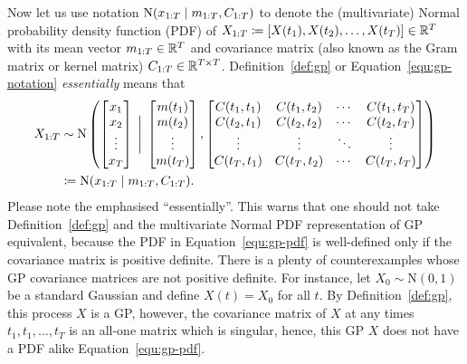 \documentclass[]{article}
\begin{document}
Now let us use notation $\mathrm{N}(x_{1:T} {\;|\;} m_{1:T}, C_{1:T})$ to denote the (multivariate) Normal probability density function (PDF) of $X_{1:T} \coloneqq [ X(t_1), X(t_2), \ldots, X(t_T) ] \allowbreak\in\mathbb{R}^T$ with its mean vector $m_{1:T} \in \mathbb{R}^T$ and covariance matrix (also known as the Gram matrix or kernel matrix) $C_{1:T} \in \mathbb{R}^{T\times T}$. Definition~\ref{def:gp} or Equation~\eqref{equ:gp-notation} \emph{essentially} means that  
%
\begin{equation}
	\begin{split}
		X_{1:T} &\sim 
		\mathrm{N}\left( 
		\begin{bmatrix}
			x_1 \\
			x_2 \\
			\vdots \\
			x_T
		\end{bmatrix} {\;\Bigg|\;}
		\begin{bmatrix}
			m(t_1) \\
			m(t_2) \\
			\vdots \\
			m(t_T)
		\end{bmatrix}, 
		\begin{bmatrix}
			C(t_1, t_1) & C(t_1, t_2) & \cdots & C(t_1, t_T) \\
			C(t_2, t_1) & C(t_2, t_2) & \cdots & C(t_2, t_T) \\
			\vdots      & \vdots      &\ddots  & \vdots \\
			C(t_T, t_1) & C(t_T, t_2) & \cdots & C(t_T, t_T)
		\end{bmatrix}
		\right) \\
		&\coloneqq \mathrm{N}(x_{1:T} {\;|\;} m_{1:T}, C_{1:T}).
	\end{split}
	\label{equ:gp-pdf}
\end{equation}
%
Please note the emphasised ``essentially''. This warns that one should not take Definition~\ref{def:gp} and the multivariate Normal PDF representation of GP equivalent, because the PDF in Equation~\eqref{equ:gp-pdf} is well-defined only if the covariance matrix is positive definite. There is a plenty of counterexamples whose GP covariance matrices are not positive definite. For instance, let $X_0 \sim \mathrm{N}(0, 1)$ be a standard Gaussian and define $X(t) = X_0$ for all $t$. By Definition~\ref{def:gp}, this process $X$ is a GP, however, the covariance matrix of $X$ at any times $t_1, t_1, \ldots, t_T$ is an all-one matrix which is singular, hence, this GP $X$ does not have a PDF alike Equation~\eqref{equ:gp-pdf}. 
\end{document}
